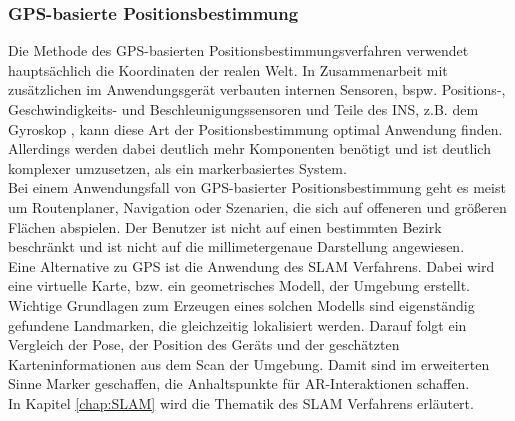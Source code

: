 \subsubsection*{\acs{GPS}-basierte Positionsbestimmung}
Die Methode des \acs{GPS}-basierten Positionsbestimmungsverfahren verwendet hauptsächlich die Koordinaten der realen Welt. In Zusammenarbeit 
mit zusätzlichen im Anwendungsgerät verbauten internen Sensoren, bspw. Positions-, Geschwindigkeits- und Beschleunigungssensoren und Teile des 
\ac{INS}, z.B. dem Gyroskop \cite{markerlesstracking.2003m}, kann diese Art der Positionsbestimmung optimal Anwendung finden. Allerdings werden dabei 
deutlich mehr Komponenten benötigt und ist deutlich komplexer umzusetzen, als ein markerbasiertes System. \cite{gps.2020a}
\\ 
Bei einem Anwendungsfall von \acs{GPS}-basierter Positionsbestimmung geht es meist um Routenplaner, Navigation oder Szenarien, die sich 
auf offeneren und größeren Flächen abspielen. 
Der Benutzer ist nicht auf einen bestimmten Bezirk beschränkt und ist nicht auf die millimetergenaue Darstellung angewiesen. \cite{gps.2020a}
\\ 
\linebreak
Eine Alternative zu \acs{GPS} ist die Anwendung des \acs{SLAM} Verfahrens. Dabei wird eine virtuelle Karte, bzw. ein geometrisches Modell, der 
Umgebung erstellt. Wichtige Grundlagen zum Erzeugen eines solchen Modells sind eigenständig gefundene Landmarken, die gleichzeitig 
lokalisiert werden. Darauf folgt ein Vergleich der Pose, der Position des Geräts und der geschätzten Karteninformationen aus dem Scan der 
Umgebung. 
Damit sind im erweiterten Sinne Marker geschaffen, die Anhaltspunkte für \acl{AR}-Interaktionen schaffen.
\\ 
In Kapitel \ref{chap:SLAM} wird die Thematik des \acs{SLAM} Verfahrens erläutert. 

